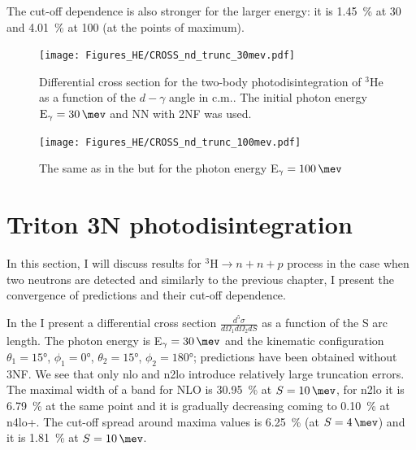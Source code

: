     The cut-off dependence is also stronger for the larger energy:
    it is  \SI{1.45}{\percent} at \SI{30}{\mev} and \SI{4.01}{\percent} at \SI{100}{\mev}
    (at the points of maximum). 

\begin{figure}[h]
    \begin{center}
        \texttt{[image: Figures\_HE/CROSS\_nd\_trunc\_30mev.pdf]}
        \end{center}
        \caption{Differential cross section for the
        two-body photodisintegration of $^3$He as a function of the $d-\gamma$ angle in c.m..
        The initial photon energy $\text{E}_\gamma=\SI{30}{\mev}$ and NN with 2NF was used.}
        \label{CROSS_nd_30}
    \end{figure}


    \begin{figure}[h]
        \begin{center}
        \texttt{[image: Figures\_HE/CROSS\_nd\_trunc\_100mev.pdf]}
        \end{center}
        \caption{The same as in the  but 
        for the photon energy E$_\gamma=\SI{100}{\mev}$}
        \label{CROSS_nd_100}
    \end{figure}

    \clearpage
\section{Triton 3N photodisintegration}
    \label{sec:triton_results}
    
    
    In this section, I will discuss results for $^3\text{H} \rightarrow n + n + p$ process in the case when two neutrons are detected 
    and similarly to the previous chapter, I present the convergence of predictions 
    and their cut-off dependence. 

    In the  I present a differential cross section 
    $\frac{d^5\sigma}{d\Omega_1d\Omega_2dS}$ as a function of the S arc length.
    The photon energy is  E$_\gamma=\SI{30}{\mev}$ and the kinematic configuration
    $\theta_1 = \ang{15}$, $\phi_1 = \ang{0}$,
    $\theta_2 = \ang{15}$, $\phi_2 = \ang{180}$; predictions have been obtained without 3NF.
    We see that only \gls{nlo} and \gls{n2lo} introduce relatively large truncation errors.
    The maximal width of a band for NLO is \SI{30.95}{\percent} at $S=\SI{10}{\mev}$,
    for \gls{n2lo} it is \SI{6.79}{\percent} at the same point and it is gradually decreasing
    coming to \SI{0.10}{\percent} at \gls{n4lo+}.
    The cut-off spread around maxima values is \SI{6.25}{\percent} (at $S=\SI{4}{\mev}$) and it is
    \SI{1.81}{\percent} at $S=\SI{10}{\mev}$.

